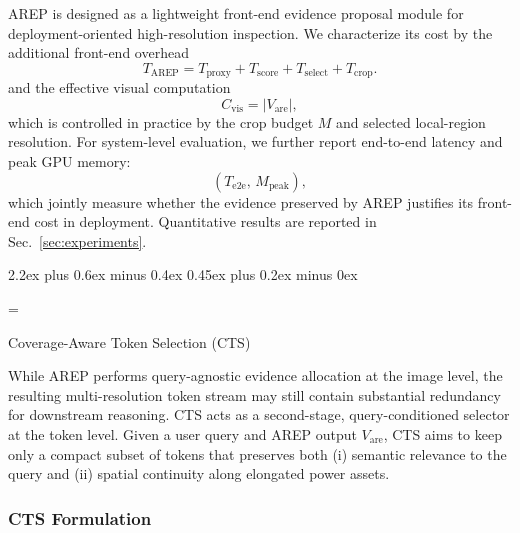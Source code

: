 \documentclass[journal,twoside,web]{ieeecolor}
\makeatletter
\renewcommand{\subsection}{\@startsection{subsection}{2}{\z@}%
  {2.2ex plus 0.6ex minus 0.4ex}%
  {0.45ex plus 0.2ex minus 0ex}%
  {\color{myorange}\normalsize\normalfont\everymath={\sf}\sf\itshape\raggedright}}
\makeatother
\begin{document}
AREP is designed as a lightweight front-end evidence proposal module for deployment-oriented high-resolution inspection.
We characterize its cost by the additional front-end overhead
\begin{equation}
  T_{\mathrm{AREP}}
  =
  T_{\mathrm{proxy}}
  +
  T_{\mathrm{score}}
  +
  T_{\mathrm{select}}
  +
  T_{\mathrm{crop}}.
  \label{eq:t_arep}
\end{equation}
and the effective visual computation
\begin{equation}
  C_{\mathrm{vis}} = |V_{\mathrm{are}}|,
  \label{eq:c_vis}
\end{equation}
which is controlled in practice by the crop budget $M$ and selected local-region resolution.
For system-level evaluation, we further report end-to-end latency and peak GPU memory:
\begin{equation}
  (T_{\mathrm{e2e}},\, M_{\mathrm{peak}}),
  \label{eq:deploy_metrics}
\end{equation}
which jointly measure whether the evidence preserved by AREP justifies its front-end cost in deployment. Quantitative results are reported in Sec.~\ref{sec:experiments}.

\subsection{Coverage-Aware Token Selection (CTS)}
\label{sec:cts}

While AREP performs query-agnostic evidence allocation at the image level, the resulting multi-resolution token stream may still contain substantial redundancy for downstream reasoning. CTS  acts as a second-stage, query-conditioned selector at the token level. Given a user query and AREP output $V_{\mathrm{are}}$, CTS aims to keep only a compact subset of tokens that preserves both (i) semantic relevance to the query and (ii) spatial continuity along elongated power assets.

\subsubsection{CTS Formulation}
\label{sec:cts_formulation}
\end{document}
